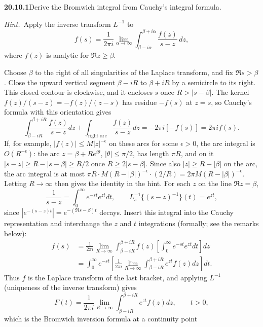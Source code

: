 \par\bigskip
\noindent\textbf{20.10.1}\quad Derive the Bromwich integral from
Cauchy's integral formula.
\par\emph{Hint.}~Apply the inverse transform $L^{-1}$ to
\[
f(s)=\frac{1}{2\pi i}\lim_{\alpha\to\infty}
\int_{\beta-i\alpha}^{\beta+i\alpha}\frac{f(z)}{s-z}\,dz,
\]
where $f(z)$ is analytic for $\Re z\ge\beta$.
\par{}
\solution
Choose $\beta$ to the right of all singularities of the
Laplace transform, and fix $\Re s>\beta$. Close the upward
vertical segment $\beta-iR$ to $\beta+iR$ by a semicircle to
its right. This closed contour is clockwise, and it encloses
$s$ once $R>|s-\beta|$. The kernel
$f(z)/(s-z)=-f(z)/(z-s)$ has residue $-f(s)$ at $z=s$, so
Cauchy's formula with this orientation gives
\[
\int_{\beta-iR}^{\beta+iR}\frac{f(z)}{s-z}dz
+\int_{\text{right arc}}\frac{f(z)}{s-z}dz
=-2\pi i[-f(s)]=2\pi i f(s).
\]
If, for example, $|f(z)|\le M|z|^{-\epsilon}$ on these arcs for
some $\epsilon>0$, the arc integral is $O(R^{-\epsilon})$: the
arc $z=\beta+Re^{i\theta}$, $|\theta|\le\pi/2$, has length $\pi R$,
and on it $|s-z|\ge R-|s-\beta|\ge R/2$ once $R\ge2|s-\beta|$.
Since also $|z|\ge R-|\beta|$ on the arc, the arc integral is
at most $\pi R\cdot M(R-|\beta|)^{-\epsilon}\cdot(2/R)
=2\pi M(R-|\beta|)^{-\epsilon}$.
Letting $R\to\infty$ then gives the identity in the hint.
For each $z$ on the line $\Re z=\beta$,
\[
\frac1{s-z}=\int_0^\infty e^{-st}e^{zt}dt,
\qquad L_s^{-1}\{(s-z)^{-1}\}(t)=e^{zt},
\]
since $|e^{-(s-z)t}|=e^{-(\Re s-\beta)t}$ decays. Insert this
integral into the Cauchy representation and interchange the
$z$ and $t$ integrations (formally; see the remarks below):
\begin{align*}
f(s)&=\frac1{2\pi i}\lim_{R\to\infty}
\int_{\beta-iR}^{\beta+iR}f(z)
\left[\int_0^\infty e^{-st}e^{zt}dt\right]dz\\
&=\int_0^\infty e^{-st}\left[\frac1{2\pi i}\lim_{R\to\infty}
\int_{\beta-iR}^{\beta+iR}e^{zt}f(z)dz\right]dt.
\end{align*}
Thus $f$ is the Laplace transform of the last bracket, and
applying $L^{-1}$ (uniqueness of the inverse transform) gives
\[
\boxed{F(t)=\frac1{2\pi i}\lim_{R\to\infty}
\int_{\beta-iR}^{\beta+iR}e^{zt}f(z)dz},\qquad t>0,
\]
which is the Bromwich inversion formula at a continuity point
